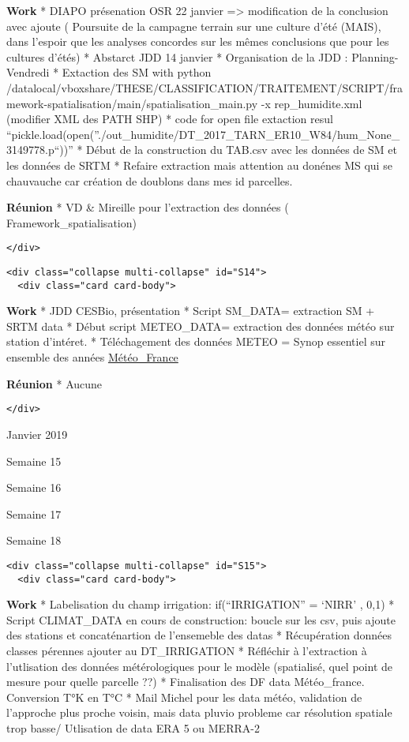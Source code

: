 \documentclass[11pt]{article}
\begin{document}
\textbf{Work} * DIAPO présenation OSR 22 janvier =\textgreater{}
modification de la conclusion avec ajoute ( Poursuite de la campagne
terrain sur une culture d'été (MAIS), dans l'espoir que les analyses
concordes sur les mêmes conclusions que pour les cultures d'étés) *
Abstarct JDD 14 janvier * Organisation de la JDD : Planning-Vendredi *
Extaction des SM with python
/datalocal/vboxshare/THESE/CLASSIFICATION/TRAITEMENT/SCRIPT/framework-spatialisation/main/spatialisation\_main.py
-x rep\_humidite.xml (modifier XML des PATH SHP) * code for open file
extaction resul
``pickle.load(open(''./out\_humidite/DT\_2017\_TARN\_ER10\_W84/hum\_None\_3149778.p``))''
* Début de la construction du TAB.csv avec les données de SM et les
données de SRTM * Refaire extraction mais attention au donénes MS qui se
chauvauche car création de doublons dans mes id parcelles.

\textbf{Réunion} * VD \& Mireille pour l'extraction des données (
Framework\_spatialisation)

\begin{verbatim}
</div>
\end{verbatim}

\begin{verbatim}
<div class="collapse multi-collapse" id="S14">
  <div class="card card-body">
\end{verbatim}

\textbf{Work} * JDD CESBio, présentation * Script SM\_DATA= extraction
SM + SRTM data * Début script METEO\_DATA= extraction des données météo
sur station d'intéret. * Téléchagement des données METEO = Synop
essentiel sur ensemble des années
\href{https://donneespubliques.meteofrance.fr/}{Météo\_France}

\textbf{Réunion} * Aucune

\begin{verbatim}
</div>
\end{verbatim}

    Janvier 2019

\hypertarget{JAN19}{}
Semaine 15

Semaine 16

Semaine 17

Semaine 18

\begin{verbatim}
<div class="collapse multi-collapse" id="S15">
  <div class="card card-body">
\end{verbatim}

\textbf{Work} * Labelisation du champ irrigation: if(``IRRIGATION'' =
`NIRR' , 0,1) * Script CLIMAT\_DATA en cours de construction: boucle sur
les csv, puis ajoute des stations et concaténartion de l'ensemeble des
datas * Récupération données classes pérennes ajouter au DT\_IRRIGATION
* Réfléchir à l'extraction à l'utlisation des données métérologiques
pour le modèle (spatialisé, quel point de mesure pour quelle parcelle
??) * Finalisation des DF data Météo\_france. Conversion T°K en T°C *
Mail Michel pour les data météo, validation de l'approche plus proche
voisin, mais data pluvio probleme car résolution spatiale trop basse/
Utlisation de data ERA 5 ou MERRA-2
\end{document}
